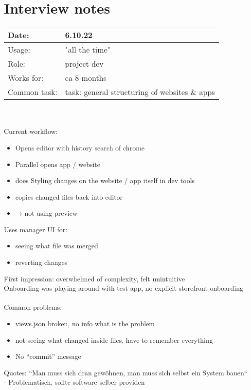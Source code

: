 \chapter{Interview notes}
\label{app:interviews}

\begin{tabular}{l l}
  Date: & 6.10.22 \\
  \hline
  Usage: & "all the time"\\
  \hline
  Role: & project dev \\
  \hline
  Works for: & ca 8 months \\
  \hline
  Common task: & task: general structuring of websites \& apps
\end{tabular}
\\\\
Current workflow:
\begin{itemize}[nosep]
  \item Opens editor with history search of chrome
  \item Parallel opens app / website
  \item does Styling changes on the website / app itself in dev tools
  \item copies changed files back into editor
  \item → not using preview
\end{itemize}

Uses manager UI for:
\begin{itemize}[nosep]
  \item seeing what file was merged
  \item reverting changes
\end{itemize}

First impression: overwhelmed of complexity, felt unintuitive\\
Onboarding was playing around with test app, no explicit storefront onboarding
\\\\
Common problems:
\begin{itemize}[nosep]
  \item views.json broken, no info what is the problem
  \item not seeing what changed inside files, have to remember everything
  \item No “commit” message
\end{itemize}

Quotes:
“Man muss sich dran gewöhnen, man muss sich selbst ein System bauen“ - Problematisch, sollte software selber providen

